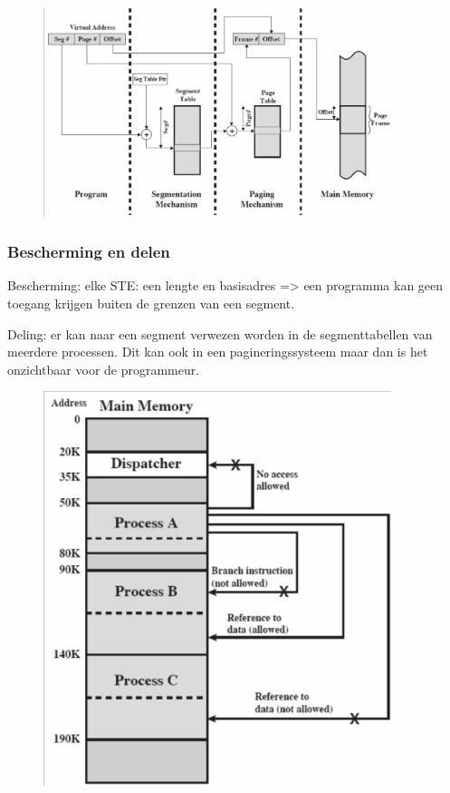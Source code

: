 \begin{figure}[htp]
    \centering
            \includegraphics[width=4in]{img/pagensegmenteren}
        \caption{}
    \label{fig:}
\end{figure}


\subsubsection{Bescherming en delen}

Bescherming: elke STE: een lengte en basisadres => een programma kan geen toegang krijgen buiten de grenzen van een segment.

Deling: er kan naar een segment verwezen worden in de segmenttabellen van meerdere 
processen. Dit kan ook in een pagineringssysteem maar dan is het onzichtbaar voor de programmeur.


\begin{figure}[htp]
    \centering
            \includegraphics[width=4in]{img/beschermingdelen}
        \caption{}
    \label{fig:}
\end{figure}
